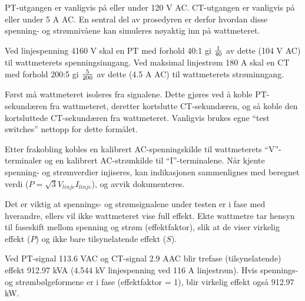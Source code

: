 





PT-utgangen er vanligvis på eller under 120 V AC. CT-utgangen er vanligvis på eller under 5 A AC. En sentral del av prosedyren er derfor hvordan disse spenning- og strømnivåene kan simuleres nøyaktig inn på wattmeteret.

\vskip 10pt

Ved linjespenning 4160 V skal en PT med forhold 40:1 gi $1 \over 40$ av dette (104 V AC) til wattmeterets spenningsinngang. Ved maksimal linjestrøm 180 A skal en CT med forhold 200:5 gi $5 \over 200$ av dette (4.5 A AC) til wattmeterets strøminngang.







Først må wattmeteret isoleres fra signalene. Dette gjøres ved å koble PT-sekundæren fra wattmeteret, deretter kortslutte CT-sekundæren, og så koble den kortsluttede CT-sekundæren fra wattmeteret. Vanligvis brukes egne ``test switches'' nettopp for dette formålet.

\vskip 10pt

Etter frakobling kobles en kalibrert AC-spenningskilde til wattmeterets ``V''-terminaler og en kalibrert AC-strømkilde til ``I''-terminalene. Når kjente spenning- og strømverdier injiseres, kan indikasjonen sammenlignes med beregnet verdi ($P = \sqrt{3} V_{linje} I_{linje}$), og avvik dokumenteres.

Det er viktig at spennings- og strømsignalene under testen er i fase med hverandre, ellers vil ikke wattmeteret vise full effekt. Ekte wattmetre tar hensyn til faseskift mellom spenning og strøm (effektfaktor), slik at de viser virkelig effekt ($P$) og ikke bare tilsynelatende effekt ($S$).

\vskip 10pt

Ved PT-signal 113.6 VAC og CT-signal 2.9 AAC blir trefase (tilsynelatende) effekt 912.97 kVA (4.544 kV linjespenning ved 116 A linjestrøm). Hvis spennings- og strømbølgeformene er i fase (effektfaktor = 1), blir virkelig effekt også 912.97 kW.

















